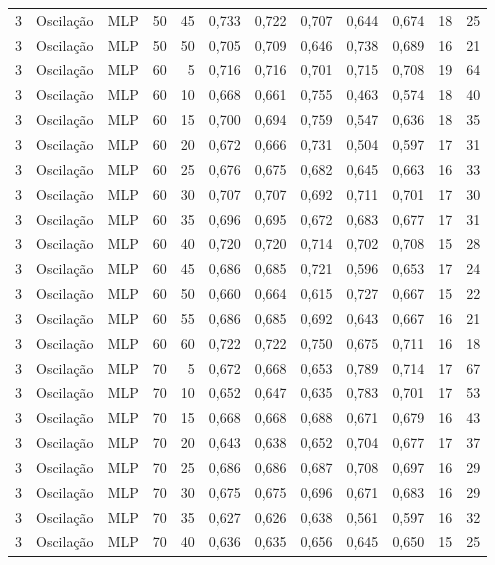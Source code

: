\begin{longtable}{@{}rllrrrrrrrrr@{}}
3 & Oscilação & MLP & 50 & 45 & 0,733 & 0,722 & 0,707 & 0,644 & 0,674 & 18 & 25 \\
3 & Oscilação & MLP & 50 & 50 & 0,705 & 0,709 & 0,646 & 0,738 & 0,689 & 16 & 21 \\
3 & Oscilação & MLP & 60 & 5 & 0,716 & 0,716 & 0,701 & 0,715 & 0,708 & 19 & 64 \\
3 & Oscilação & MLP & 60 & 10 & 0,668 & 0,661 & 0,755 & 0,463 & 0,574 & 18 & 40 \\
3 & Oscilação & MLP & 60 & 15 & 0,700 & 0,694 & 0,759 & 0,547 & 0,636 & 18 & 35 \\
3 & Oscilação & MLP & 60 & 20 & 0,672 & 0,666 & 0,731 & 0,504 & 0,597 & 17 & 31 \\
3 & Oscilação & MLP & 60 & 25 & 0,676 & 0,675 & 0,682 & 0,645 & 0,663 & 16 & 33 \\
3 & Oscilação & MLP & 60 & 30 & 0,707 & 0,707 & 0,692 & 0,711 & 0,701 & 17 & 30 \\
3 & Oscilação & MLP & 60 & 35 & 0,696 & 0,695 & 0,672 & 0,683 & 0,677 & 17 & 31 \\
3 & Oscilação & MLP & 60 & 40 & 0,720 & 0,720 & 0,714 & 0,702 & 0,708 & 15 & 28 \\
3 & Oscilação & MLP & 60 & 45 & 0,686 & 0,685 & 0,721 & 0,596 & 0,653 & 17 & 24 \\
3 & Oscilação & MLP & 60 & 50 & 0,660 & 0,664 & 0,615 & 0,727 & 0,667 & 15 & 22 \\
3 & Oscilação & MLP & 60 & 55 & 0,686 & 0,685 & 0,692 & 0,643 & 0,667 & 16 & 21 \\
3 & Oscilação & MLP & 60 & 60 & 0,722 & 0,722 & 0,750 & 0,675 & 0,711 & 16 & 18 \\
3 & Oscilação & MLP & 70 & 5 & 0,672 & 0,668 & 0,653 & 0,789 & 0,714 & 17 & 67 \\
3 & Oscilação & MLP & 70 & 10 & 0,652 & 0,647 & 0,635 & 0,783 & 0,701 & 17 & 53 \\
3 & Oscilação & MLP & 70 & 15 & 0,668 & 0,668 & 0,688 & 0,671 & 0,679 & 16 & 43 \\
3 & Oscilação & MLP & 70 & 20 & 0,643 & 0,638 & 0,652 & 0,704 & 0,677 & 17 & 37 \\
3 & Oscilação & MLP & 70 & 25 & 0,686 & 0,686 & 0,687 & 0,708 & 0,697 & 16 & 29 \\
3 & Oscilação & MLP & 70 & 30 & 0,675 & 0,675 & 0,696 & 0,671 & 0,683 & 16 & 29 \\
3 & Oscilação & MLP & 70 & 35 & 0,627 & 0,626 & 0,638 & 0,561 & 0,597 & 16 & 32 \\
3 & Oscilação & MLP & 70 & 40 & 0,636 & 0,635 & 0,656 & 0,645 & 0,650 & 15 & 25 \\

\end{longtable}

